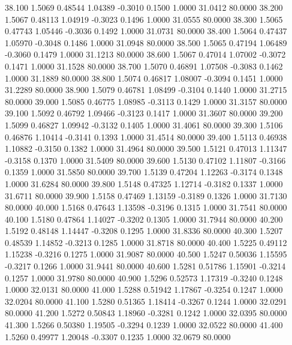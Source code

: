   38.100   1.5069   0.48544   1.04389  -0.3010   0.1500   1.0000  31.0412  80.0000
  38.200   1.5067   0.48113   1.04919  -0.3023   0.1496   1.0000  31.0555  80.0000
  38.300   1.5065   0.47743   1.05446  -0.3036   0.1492   1.0000  31.0731  80.0000
  38.400   1.5064   0.47437   1.05970  -0.3048   0.1486   1.0000  31.0948  80.0000
  38.500   1.5065   0.47194   1.06489  -0.3060   0.1479   1.0000  31.1213  80.0000
  38.600   1.5067   0.47014   1.07002  -0.3072   0.1471   1.0000  31.1528  80.0000
  38.700   1.5070   0.46891   1.07508  -0.3083   0.1462   1.0000  31.1889  80.0000
  38.800   1.5074   0.46817   1.08007  -0.3094   0.1451   1.0000  31.2289  80.0000
  38.900   1.5079   0.46781   1.08499  -0.3104   0.1440   1.0000  31.2715  80.0000
  39.000   1.5085   0.46775   1.08985  -0.3113   0.1429   1.0000  31.3157  80.0000
  39.100   1.5092   0.46792   1.09466  -0.3123   0.1417   1.0000  31.3607  80.0000
  39.200   1.5099   0.46827   1.09942  -0.3132   0.1405   1.0000  31.4061  80.0000
  39.300   1.5106   0.46876   1.10414  -0.3141   0.1393   1.0000  31.4514  80.0000
  39.400   1.5113   0.46938   1.10882  -0.3150   0.1382   1.0000  31.4964  80.0000
  39.500   1.5121   0.47013   1.11347  -0.3158   0.1370   1.0000  31.5409  80.0000
  39.600   1.5130   0.47102   1.11807  -0.3166   0.1359   1.0000  31.5850  80.0000
  39.700   1.5139   0.47204   1.12263  -0.3174   0.1348   1.0000  31.6284  80.0000
  39.800   1.5148   0.47325   1.12714  -0.3182   0.1337   1.0000  31.6711  80.0000
  39.900   1.5158   0.47469   1.13159  -0.3189   0.1326   1.0000  31.7130  80.0000
  40.000   1.5168   0.47643   1.13598  -0.3196   0.1315   1.0000  31.7541  80.0000
  40.100   1.5180   0.47864   1.14027  -0.3202   0.1305   1.0000  31.7944  80.0000
  40.200   1.5192   0.48148   1.14447  -0.3208   0.1295   1.0000  31.8336  80.0000
  40.300   1.5207   0.48539   1.14852  -0.3213   0.1285   1.0000  31.8718  80.0000
  40.400   1.5225   0.49112   1.15238  -0.3216   0.1275   1.0000  31.9087  80.0000
  40.500   1.5247   0.50036   1.15595  -0.3217   0.1266   1.0000  31.9441  80.0000
  40.600   1.5281   0.51786   1.15901  -0.3214   0.1257   1.0000  31.9780  80.0000
  40.900   1.5296   0.52573   1.17319  -0.3240   0.1248   1.0000  32.0131  80.0000
  41.000   1.5288   0.51942   1.17867  -0.3254   0.1247   1.0000  32.0204  80.0000
  41.100   1.5280   0.51365   1.18414  -0.3267   0.1244   1.0000  32.0291  80.0000
  41.200   1.5272   0.50843   1.18960  -0.3281   0.1242   1.0000  32.0395  80.0000
  41.300   1.5266   0.50380   1.19505  -0.3294   0.1239   1.0000  32.0522  80.0000
  41.400   1.5260   0.49977   1.20048  -0.3307   0.1235   1.0000  32.0679  80.0000
